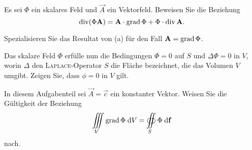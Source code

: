 \begin{atiTask}[
  title = Spezielle Vektorfelder
]

\begin{atiSubtasks}
\item Es sei $\Phi$ ein skalares Feld und $\vec{A}$ ein Vektorfeld. Beweisen Sie die Beziehung
\[
\operatorname{div} (\Phi \mathbf{A})=\mathbf{A}\cdot\operatorname{grad} \Phi+\Phi\cdot \operatorname{div} \mathbf{A}.
\]
\item Spezialisieren Sie das Resultat von (a) für den Fall $\mathbf{A}=\operatorname{grad} \Phi$.
\item Das skalare Feld $\Phi$ erfülle nun die Bedingungen $\Phi=0$ auf $S$ und $\Delta \Phi=0$ in $V$, worin $\Delta$ den \textsc{Laplace}-Operator $S$ die Fläche bezeichnet, die das Volumen $V$ umgibt. Zeigen Sie, dass $\phi=0$ in $V$ gilt.
\item In diesem Aufgabenteil sei $\vec{A}=\vec{c}$ ein konstanter Vektor. Weisen Sie die Gültigkeit der Beziehung
\[
\iiint\limits_{V}\operatorname{grad} \Phi\;\mathrm{d}V=\oiint\limits_{S}\Phi\;\mathrm{d} \mathbf{f}
\]
nach.
\end{atiSubtasks}


\end{atiTask}